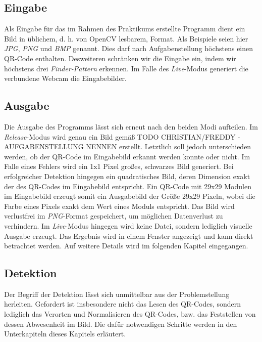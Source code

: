 \documentclass[a4paper, oneside, 12pt]{article}
\begin{document}
\subsection{Eingabe}
\label{s:eingabe}

Als Eingabe für das im Rahmen des Praktikums erstellte Programm dient ein Bild in üblichem, d. h. von OpenCV lesbarem, Format. Als Beispiele seien hier \emph{JPG}, \emph{PNG} und \emph{BMP} genannt.
Dies darf nach Aufgabenstellung höchstens einen QR-Code enthalten.
Desweiteren schränken wir die Eingabe ein, indem wir höchstens drei \emph{Finder-Pattern} erkennen.
Im Falle des \emph{Live}-Modus generiert die verbundene Webcam die Eingabebilder.

\subsection{Ausgabe}
\label{s:ausgabe}

Die Ausgabe des Programms lässt sich erneut nach den beiden Modi aufteilen.
Im \emph{Release}-Modus wird genau ein Bild gemäß
TODO CHRISTIAN/FREDDY - AUFGABENSTELLUNG NENNEN
erstellt. Letztlich soll jedoch unterschieden werden, ob der QR-Code im Eingabebild erkannt werden konnte oder nicht. Im Falle eines Fehlers wird ein 1x1 Pixel großes, schwarzes Bild generiert. Bei erfolgreicher Detektion hingegen ein quadratisches Bild, deren Dimension exakt der des QR-Codes im Eingabebild entspricht.
Ein QR-Code mit 29x29 Modulen im Eingabebild erzeugt somit ein Ausgabebild der Größe 29x29 Pixeln, wobei die Farbe eines Pixels exakt dem Wert eines Moduls entspricht.
Das Bild wird verlustfrei im \emph{PNG}-Format gespeichert, um möglichen Datenverlust zu verhindern.
Im \emph{Live}-Modus hingegen wird keine Datei, sondern lediglich visuelle Ausgabe erzeugt. Das Ergebnis wird in einem Fenster angezeigt und kann direkt betrachtet werden. Auf weitere Details wird im folgenden Kapitel eingegangen.

\subsection{Detektion}
\label{s:detektion}

Der Begriff der Detektion lässt sich unmittelbar aus der Problemstellung herleiten.
Gefordert ist insbesondere nicht das Lesen des QR-Codes, sondern lediglich das Verorten und Normalisieren des QR-Codes, bzw. das Feststellen von dessen Abwesenheit im Bild. Die dafür notwendigen Schritte werden in den Unterkapiteln dieses Kapitels erläutert.
\end{document}
